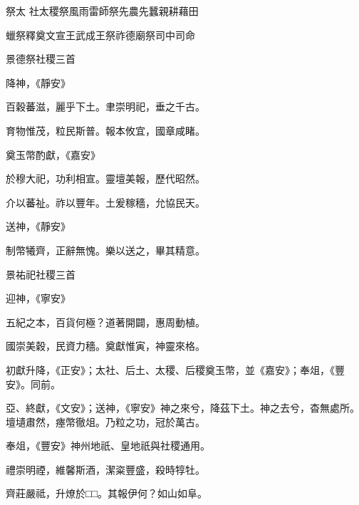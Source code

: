 
\begin{pinyinscope}

 祭太
 社太稷祭風雨雷師祭先農先蠶親耕藉田



 蠟祭釋奠文宣王武成王祭祚德廟祭司中司命



 景德祭社稷三首



 降神，《靜安》



 百穀蕃滋，麗乎下土。聿崇明祀，垂之千古。



 育物惟茂，粒民斯普。報本攸宜，國章咸睹。



 奠玉幣酌獻，《嘉安》



 於穆大祀，功利相宣。靈壇美報，歷代昭然。



 介以蕃祉。祚以豐年。土爰稼穡，允協民天。



 送神，《靜安》



 制幣犧齊，正辭無愧。樂以送之，畢其精意。



 景祐祀社稷三首



 迎神，《寧安》



 五紀之本，百貨何極？道著開闢，惠周動植。



 國崇美穀，民資力穡。奠獻惟寅，神靈來格。



 初獻升降，《正安》；太社、后土、太稷、后稷奠玉幣，並《嘉安》；奉俎，《豐安》。同前。



 亞、終獻，《文安》；送神，《寧安》神之來兮，降茲下土。神之去兮，杳無處所。壇壝肅然，瘞幣徹俎。乃粒之功，冠於萬古。



 奉俎，《豐安》神州地祇、皇地祇與社稷通用。



 禮崇明禋，維馨斯酒，潔粢豐盛，殺時犉牡。



 齊莊嚴祗，升燎於□□。其報伊何？如山如阜。




\end{pinyinscope}
